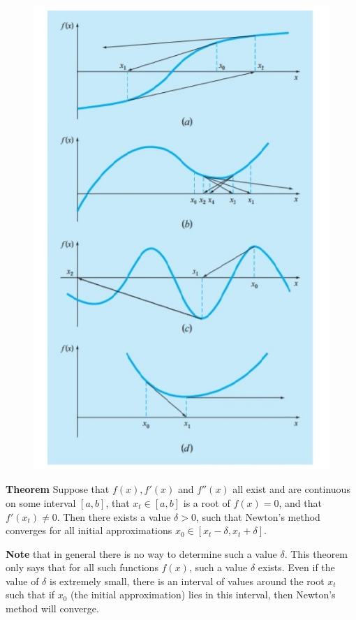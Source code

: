 \documentclass [titlepage,12pt,letter] {article}
\begin{document}
\begin{figure}[ht]
  \centering
  \includegraphics[scale=1]{BadNewton}
  \label{fig:BadNewton}
\end{figure}


\noindent 
{\bf Theorem} Suppose that $f(x),f'(x)$ and $f''(x)$ all exist and are continuous on some interval $[a,b]$, that $x_t \in [a,b]$ is a root of $f(x) = 0$, and that $f'(x_t) \neq 0$. Then there exists a value $\delta > 0$, such that Newton's method converges for all initial approximations $x_0 \in [x_t - \delta, x_t + \delta]$. 

{\bf Note} that in general there is no way to determine such a value $\delta$. This theorem only says that for all such functions $f(x)$, such a value $\delta$ exists. Even if the value of $\delta$ is extremely small, there is an interval of values around the root $x_t$ such that if $x_0$ (the initial approximation) lies in this interval, then Newton's method will converge. 
\end{document}
